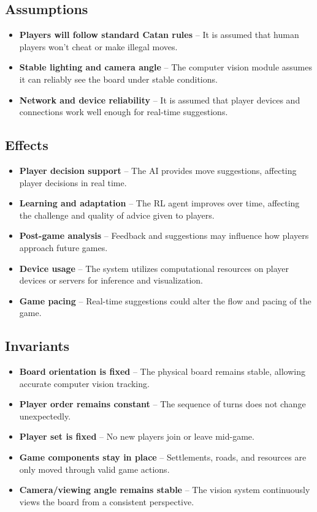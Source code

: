 \documentclass{article}
\begin{document}
\subsection{Assumptions}\label{subsec:assumptions}
\begin{itemize}
    \item \textbf{Players will follow standard Catan rules} – It is assumed that human players won’t cheat or make illegal moves.
    \item \textbf{Stable lighting and camera angle} – The computer vision module assumes it can reliably see the board under stable conditions.
    \item \textbf{Network and device reliability} – It is assumed that player devices and connections work well enough for real-time suggestions.
\end{itemize}

\subsection{Effects}\label{subsec:effects}
\begin{itemize}
    \item \textbf{Player decision support} – The AI provides move suggestions, affecting player decisions in real time.
    \item \textbf{Learning and adaptation} – The RL agent improves over time, affecting the challenge and quality of advice given to players.
    \item \textbf{Post-game analysis} – Feedback and suggestions may influence how players approach future games.
    \item \textbf{Device usage} – The system utilizes computational resources on player devices or servers for inference and visualization.
    \item \textbf{Game pacing} – Real-time suggestions could alter the flow and pacing of the game.
\end{itemize}

\subsection{Invariants}\label{subsec:invariants}
\begin{itemize}
    \item \textbf{Board orientation is fixed} – The physical board remains stable, allowing accurate computer vision tracking.
    \item \textbf{Player order remains constant} – The sequence of turns does not change unexpectedly.
    \item \textbf{Player set is fixed} – No new players join or leave mid-game.
    \item \textbf{Game components stay in place} – Settlements, roads, and resources are only moved through valid game actions.
    \item \textbf{Camera/viewing angle remains stable} – The vision system continuously views the board from a consistent perspective.
\end{itemize}
\end{document}
